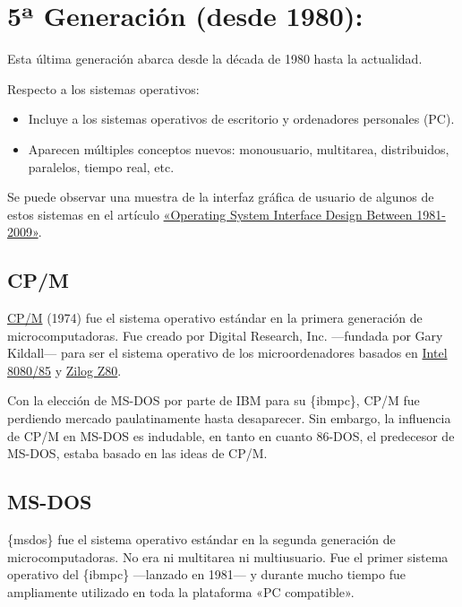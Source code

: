 \section{5ª Generación (desde
1980):}\label{sect-historia-quinta-generaciuxf3n}

Esta última generación abarca desde la década de 1980 hasta la
actualidad.

Respecto a los sistemas operativos:

\begin{itemize}
\item
  Incluye a los sistemas operativos de escritorio y ordenadores
  personales (PC).
\item
  Aparecen múltiples conceptos nuevos: monousuario, multitarea,
  distribuidos, paralelos, tiempo real, etc.
\end{itemize}

Se puede observar una muestra de la interfaz gráfica de usuario de
algunos de estos sistemas en el artículo
\href{https://www.webdesignerdepot.com/2009/03/operating-system-interface-design-between-1981-2009/}{«Operating
System Interface Design Between 1981-2009»}.

\subsection{CP/M}\label{_cpm}

\href{https://en.wikipedia.org/wiki/CP/M}{CP/M} (1974) fue el sistema
operativo estándar en la primera generación de microcomputadoras. Fue
creado por Digital Research, Inc. ---fundada por Gary Kildall--- para
ser el sistema operativo de los microordenadores basados en
\href{https://es.wikipedia.org/wiki/Intel_8080}{Intel 8080/85} y
\href{https://es.wikipedia.org/wiki/Zilog_Z80}{Zilog Z80}.

Con la elección de MS-DOS por parte de IBM para su \{ibmpc\}, CP/M fue
perdiendo mercado paulatinamente hasta desaparecer. Sin embargo, la
influencia de CP/M en MS-DOS es indudable, en tanto en cuanto 86-DOS, el
predecesor de MS-DOS, estaba basado en las ideas de CP/M.

\subsection{MS-DOS}\label{_ms_dos}

\{msdos\} fue el sistema operativo estándar en la segunda generación de
microcomputadoras. No era ni multitarea ni multiusuario. Fue el primer
sistema operativo del \{ibmpc\} ---lanzado en 1981--- y durante mucho
tiempo fue ampliamente utilizado en toda la plataforma «PC compatible».

